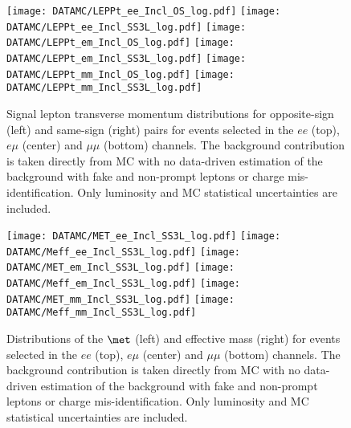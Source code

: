 \begin{figure}[htb!]
\centering
{\texttt{[image: DATAMC/LEPPt\_ee\_Incl\_OS\_log.pdf]}}
{\texttt{[image: DATAMC/LEPPt\_ee\_Incl\_SS3L\_log.pdf]}}
{\texttt{[image: DATAMC/LEPPt\_em\_Incl\_OS\_log.pdf]}}
{\texttt{[image: DATAMC/LEPPt\_em\_Incl\_SS3L\_log.pdf]}}
{\texttt{[image: DATAMC/LEPPt\_mm\_Incl\_OS\_log.pdf]}}
{\texttt{[image: DATAMC/LEPPt\_mm\_Incl\_SS3L\_log.pdf]}}
\caption{Signal lepton transverse momentum distributions for opposite-sign (left) and same-sign (right) pairs for events selected in the $ee$ (top), $e\mu$ (center) and $\mu\mu$ (bottom) channels. The background contribution is taken directly from MC with no data-driven estimation of the background with fake and non-prompt leptons or charge mis-identification. 
Only luminosity and MC statistical uncertainties are included.
}
\label{fig:dataMC_lep1}
\end{figure}

\begin{figure}[htb!]
\centering
{\texttt{[image: DATAMC/MET\_ee\_Incl\_SS3L\_log.pdf]}}
{\texttt{[image: DATAMC/Meff\_ee\_Incl\_SS3L\_log.pdf]}}
{\texttt{[image: DATAMC/MET\_em\_Incl\_SS3L\_log.pdf]}}
{\texttt{[image: DATAMC/Meff\_em\_Incl\_SS3L\_log.pdf]}}
{\texttt{[image: DATAMC/MET\_mm\_Incl\_SS3L\_log.pdf]}}
{\texttt{[image: DATAMC/Meff\_mm\_Incl\_SS3L\_log.pdf]}}
\caption{Distributions of the $\met$ (left) and effective mass (right) for events selected in the $ee$ (top), $e\mu$ (center) and $\mu\mu$ (bottom) channels. The background contribution is taken directly from MC with no data-driven estimation of the background with fake and non-prompt leptons or charge mis-identification. Only luminosity and MC statistical uncertainties are included.
}
\label{fig:dataMC_metmeff}
\end{figure}
